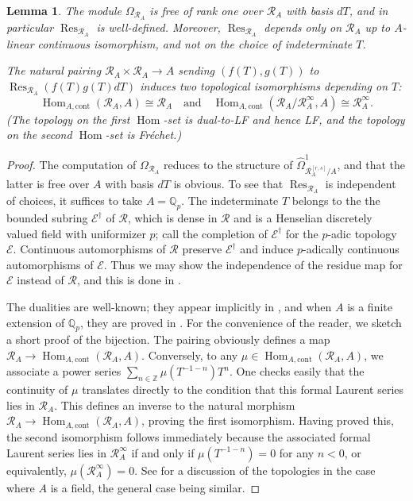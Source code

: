 \documentclass[12pt]{article}
\newtheorem{lemma}[theorem]{Lemma}
\theoremstyle{definition}
\numberwithin{equation}{theorem}
\newcommand{\calE}{\mathcal{E}}
\newcommand{\calR}{\mathcal{R}}
\newcommand{\QQ}{\mathbb{Q}}
\newcommand{\ZZ}{\mathbb{Z}}
\newcommand{\cont}{\mathrm{cont}}
\def\Qp{\QQ_p}
\DeclareMathOperator{\Hom}{Hom}
\DeclareMathOperator{\Res}{Res}
\begin{document}
\begin{lemma}
\label{L:calR duality}
The module $\Omega_{\calR_A}$ is free of rank one over $\calR_A$ with
basis $dT$, and in particular $\Res_{\calR_A}$ is well-defined.
Moreover, $\Res_{\calR_A}$ depends only on $\calR_A$ up to $A$-linear
continuous isomorphism, and not on the choice of indeterminate $T$.

The natural pairing $\calR_A \times \calR_A \to A$ sending $(f(T),
g(T))$ to $\Res_{\calR_A}(f(T)g(T)dT)$ induces two topological
isomorphisms depending on $T$:
\[
\Hom_{A, \cont}(\calR_A, A) \cong \calR_A \quad\textrm{and}\quad \Hom_{A, \cont} (\calR_A/\calR^\infty_A, A) \cong \calR^\infty_A.
\]
(The topology on the first $\Hom$-set is dual-to-LF and hence LF, and
the topology on the second $\Hom$-set is Fr\'echet.)
\end{lemma}
\begin{proof}
The computation of $\Omega_{\calR_A}$ reduces to the structure of
$\widehat{\Omega}^1_{\calR_A^{[r,s]}/A}$, and that the latter is free
over $A$ with basis $dT$ is obvious.  To see that $\Res_{\calR_A}$ is
independent of choices, it suffices to take $A=\QQ_p$.  The
indeterminate $T$ belongs to the the bounded subring $\calE^\dag$ of
$\calR$, which is dense in $\calR$ and is a Henselian discretely
valued field with uniformizer $p$; call the completion of $\calE^\dag$
for the $p$-adic topology $\calE$.  Continuous automorphisms of
$\calR$ preserve $\calE^\dag$ and induce $p$-adically continuous
automorphisms of $\calE$.  Thus we may show the independence of the
residue map for $\calE$ instead of $\calR$, and this is done in
\cite[A2 2.2.3]{fontaine}.

The dualities are well-known; they appear implicitly in
\cite[Section~8.5]{kedlaya-finite}, and when $A$ is a finite extension
of $\Qp$, they are proved in \cite[Theorem~5.4]{crew}.  For the
convenience of the reader, we sketch a short proof of the bijection.
The pairing obviously defines a map $\calR_A \to
\Hom_{A,\cont}(\calR_A, A)$.  Conversely, to any
$\mu\in\Hom_{A,\cont}(\calR_A, A)$, we associate a power series
$\sum_{n \in\ZZ}\mu(T^{-1-n})T^n$.  One checks easily that the
continuity of $\mu$ translates directly to the condition that this
formal Laurent series lies in $\calR_A$.  This defines an inverse to
the natural morphism $\calR_A \to \Hom_{A,\cont}(\calR_A, A)$, proving
the first isomorphism.  Having proved this, the second isomorphism
follows immediately because the associated formal Laurent series lies
in $\calR_A^\infty$ if and only if $\mu(T^{-1-n})=0$ for any $n<0$, or
equivalently, $\mu(\calR_A^\infty)=0$.  See
\cite[Proposition~5.5]{crew} for a discussion of the topologies in the
case where $A$ is a field, the general case being similar.
\end{proof}
\end{document}
